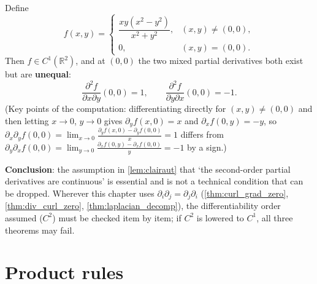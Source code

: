 \begin{example}\label{ex:clairaut_failure}
Define
\[
f(x,y) =
\begin{cases}
\dfrac{xy(x^2-y^2)}{x^2+y^2}, & (x,y)\ne(0,0),\\[6pt]
0, & (x,y)=(0,0).
\end{cases}
\]
Then $f\in C^1(\mathbb R^2)$, and at $(0,0)$ the two mixed partial derivatives both exist but are \textbf{unequal}:
\[
\frac{\partial^2 f}{\partial x\partial y}(0,0) = 1,
\qquad
\frac{\partial^2 f}{\partial y\partial x}(0,0) = -1 .
\]
(Key points of the computation: differentiating directly for $(x,y)\ne(0,0)$ and then letting $x\to0$, $y\to0$ gives $\partial_yf(x,0)=x$ and $\partial_x f(0,y)=-y$, so $\partial_x\partial_yf(0,0)=\lim_{x\to0}\frac{\partial_yf(x,0)-\partial_yf(0,0)}{x}=1$ differs from $\partial_y\partial_xf(0,0)=\lim_{y\to0}\frac{\partial_xf(0,y)-\partial_xf(0,0)}{y}=-1$ by a sign.)

\textbf{Conclusion}: the assumption in \cref{lem:clairaut} that `the second-order partial derivatives are continuous' is essential and is not a technical condition that can be dropped. Wherever this chapter uses $\partial_i\partial_j=\partial_j\partial_i$ (\cref{thm:curl_grad_zero}, \cref{thm:div_curl_zero}, \cref{thm:laplacian_decomp}), the differentiability order assumed ($C^2$) must be checked item by item; if $C^2$ is lowered to $C^1$, all three theorems may fail.
\end{example}

\section{Product rules}

